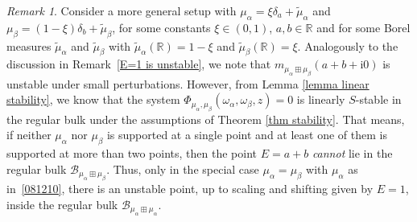 \documentclass[10pt,reqno]{amsart}
\numberwithin{equation}{section}
\theoremstyle{plain}
\newcounter{kevin}
\numberwithin{kevin}{section}
\theoremstyle{remark}
\newtheorem{remark}[kevin]{Remark}
\newcommand{\ii}{\mathrm{i}}
\newcommand{\PP}{\Phi}
\begin{document}
\begin{remark} Consider a more general setup with $\mu_\alpha=\xi\delta_a+\widetilde{\mu}_\alpha$ and $\mu_\beta=(1-\xi)\delta_b+\widetilde{\mu}_{\beta}$, for some constants $\xi\in (0,1)$, $a,b\in\mathbb{R}$ and for some Borel measures $\widetilde{\mu}_\alpha$ and $\widetilde{\mu}_\beta$ with 
$\widetilde{\mu}_\alpha(\mathbb{R})=1-\xi$ and $\widetilde{\mu}_\beta(\mathbb{R})=\xi$. Analogously to the discussion in Remark~\ref{E=1 is unstable}, we note that $m_{\mu_\alpha\boxplus\mu_\beta}(a+b+\ii0)$ is unstable under small perturbations. However, from Lemma \ref{lemma linear stability}, we know that the system $\PP_{\mu_\alpha,\mu_\beta}(\omega_\alpha,\omega_\beta,z)=0$ is linearly $S$-stable in the regular bulk under the assumptions of Theorem \ref{thm stability}. That means, if neither $\mu_\alpha$ nor $\mu_\beta$ is supported at a single point and at least one of them is supported at more than two points, then the point $E=a+b$ {\it cannot} lie in the regular bulk $\mathcal{B}_{\mu_\alpha\boxplus\mu_\beta}$. Thus, only in the special case $\mu_\alpha=\mu_\beta$ with $\mu_\alpha$ as in~\eqref{081210}, there is an unstable point, up to scaling and shifting given by $E=1$, inside the regular bulk $\mathcal{B}_{\mu_\alpha\boxplus\mu_\alpha}$.
\end{remark}
\end{document}
